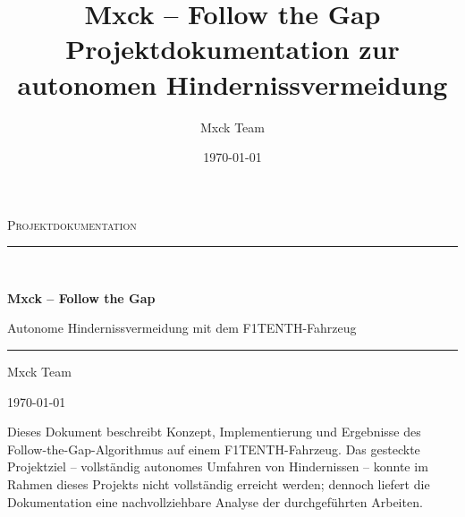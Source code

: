\documentclass[12pt, a4paper, twoside, openany]{book}
\title{Mxck – Follow the Gap\\[0.5em]
       \large Projektdokumentation zur autonomen Hindernissvermeidung}
\author{Mxck Team}
\date{\today}
\begin{document}

\begin{titlepage}
  \centering
  \vspace*{2cm}
  {\scshape\LARGE Projektdokumentation\par}
  \vspace{1cm}
  \rule{\linewidth}{1pt}\\[0.4em]
  {\Huge\bfseries Mxck -- Follow the Gap\par}
  {\large Autonome Hindernissvermeidung mit dem F1TENTH-Fahrzeug\par}
  \rule{\linewidth}{1pt}
  \vspace{2cm}

  {\Large Mxck Team\par}
  \vspace{0.5cm}
  {\large\today\par}

  \vfill
  \vfill

  {\small
   Dieses Dokument beschreibt Konzept, Implementierung und Ergebnisse
   des Follow-the-Gap-Algorithmus auf einem F1TENTH-Fahrzeug.
   Das gesteckte Projektziel -- vollständig autonomes Umfahren von
   Hindernissen -- konnte im Rahmen dieses Projekts nicht vollständig
   erreicht werden; dennoch liefert die Dokumentation eine nachvollziehbare
   Analyse der durchgeführten Arbeiten.
  }
\end{titlepage}

\frontmatter
\tableofcontents
\listoffigures
\listoftables
\lstlistoflistings

\mainmatter







\backmatter


\end{document}
